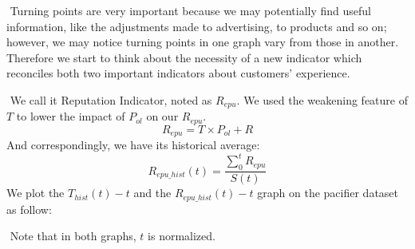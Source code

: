 \documentclass[12pt]{article}  %
\begin{document}
​		Turning points are very important because we may potentially find useful information, like the adjustments made to advertising, to products and so on; however, we may notice turning points in one graph vary from those in another. Therefore we start to think about the necessity of a new indicator which reconciles both two important indicators about customers' experience.

​		We call it Reputation Indicator, noted as $R_{epu}$. We used the weakening feature of $T$ to lower the impact of $P_{ol}$ on our $R_{epu}$.
$$
R_{epu} = T \times P_{ol} + R
$$
​		And correspondingly, we have its historical average:
$$
R_{epu\_hist}(t) = \frac{\sum_{0}^{t} R_{epu}}{S(t)}
$$
​		We plot the $T_{hist}(t)-t$ and the $R_{epu\_hist}(t)-t$ graph on the pacifier dataset as follow:

​		Note that in both graphs, $t$ is normalized.
\end{document}
